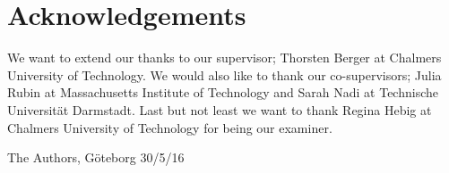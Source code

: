 \thispagestyle{plain}			%
\section*{Acknowledgements}
We want to extend our thanks to our supervisor; Thorsten Berger at Chalmers University of Technology. We would also like to thank our co-supervisors; Julia Rubin at Massachusetts Institute of Technology and Sarah Nadi at Technische Universität Darmstadt. Last but not least we want to thank Regina Hebig at Chalmers University of Technology for being our examiner.

The Authors, Göteborg 30/5/16

\newpage				%
\thispagestyle{empty}
\mbox{}




